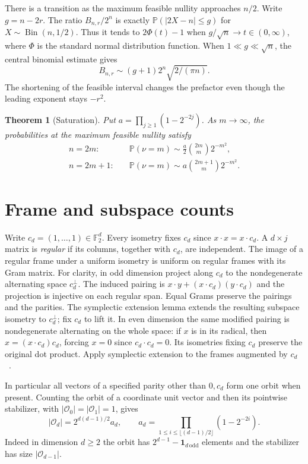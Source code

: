 \documentclass[11pt,letterpaper]{article}
\newtheorem{theorem}{Theorem}
\newcommand{\F}{\mathbb F_2}\newcommand{\E}{\mathbb E}\newcommand{\PP}{\mathbb P}
\newcommand{\ind}{\mathbf 1}
\newcommand{\rgp}{\mathcal O}
\begin{document}
There is a transition as the maximum feasible nullity approaches $n/2$. Write $g=n-2r$. The ratio $B_{n,r}/2^n$ is exactly $\PP(|2X-n|\le g)$ for $X\sim\operatorname{Bin}(n,1/2)$. Thus it tends to $2\Phi(t)-1$ when $g/\sqrt n\to t\in(0,\infty)$, where $\Phi$ is the standard normal distribution function. When $1\ll g\ll\sqrt n$, the central binomial estimate gives
\[
 B_{n,r}\sim (g+1)2^n\sqrt{2/(\pi n)} .
\]
The shortening of the feasible interval changes the prefactor even though the leading exponent stays $-r^2$.

\begin{theorem}[Saturation]\label{thm:end}
Put $a=\prod_{j\ge1}(1-2^{-2j})$. As $m\to\infty$, the probabilities at the maximum feasible nullity satisfy
\begin{align}
 n=2m:\quad &\PP(\nu=m)\sim\tfrac a2\binom{2m}{m}2^{-m^2},\label{eq:even}\\
 n=2m+1:\quad &\PP(\nu=m)\sim a\binom{2m+1}{m}2^{-m^2}.\label{eq:odd}
\end{align}
\end{theorem}

\section{Frame and subspace counts}
Write $c_d=(1,\ldots,1)\in\F^d$. Every isometry fixes $c_d$ since $x\cdot x=x\cdot c_d$. A $d\times j$ matrix is \emph{regular} if its columns, together with $c_d$, are independent. The image of a regular frame under a uniform isometry is uniform on regular frames with its Gram matrix. For clarity, in odd dimension project along $c_d$ to the nondegenerate alternating space $c_d^\perp$. The induced pairing is $x\cdot y+(x\cdot c_d)(y\cdot c_d)$ and the projection is injective on each regular span. Equal Grams preserve the pairings and the parities. The symplectic extension lemma extends the resulting subspace isometry to $c_d^\perp$; fix $c_d$ to lift it. In even dimension the same modified pairing is nondegenerate alternating on the whole space: if $x$ is in its radical, then $x=(x\cdot c_d)c_d$, forcing $x=0$ since $c_d\cdot c_d=0$. Its isometries fixing $c_d$ preserve the original dot product. Apply symplectic extension to the frames augmented by $c_d$~\cite{witt}.

In particular all vectors of a specified parity other than $0,c_d$ form one orbit when present. Counting the orbit of a coordinate unit vector and then its pointwise stabilizer, with $|\rgp_0|=|\rgp_1|=1$, gives
\begin{equation}\label{eq:order}
 |\rgp_d|=2^{d(d-1)/2}a_d,\qquad
 a_d=\prod_{1\le i\le\lfloor(d-1)/2\rfloor}(1-2^{-2i}).
\end{equation}
Indeed in dimension $d\ge2$ the orbit has $2^{d-1}-\ind_{d\,\mathrm{odd}}$ elements and the stabilizer has size $|\rgp_{d-1}|$.
\end{document}
